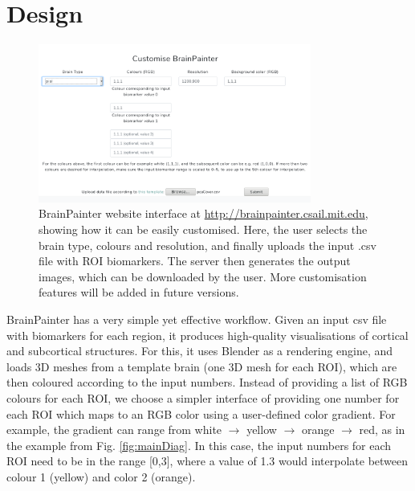 \documentclass[final,times,twocolumn,authoryear]{elsarticle}
\begin{document}
\FloatBarrier
\section{Design}
\label{design}


\begin{figure}[htp]
\centering
 \includegraphics[width=0.8\textwidth]{images/website.png}
 \caption{BrainPainter website interface at \url{http://brainpainter.csail.mit.edu}, showing how it can be easily customised. Here, the user selects the brain type, colours and resolution, and finally uploads the input .csv file with ROI biomarkers. The server then generates the output images, which can be downloaded by the user. More customisation features will be added in future versions.}
  \label{fig:website}
\end{figure}

BrainPainter has a very simple yet effective workflow. Given an input csv file with biomarkers for each region, it produces high-quality visualisations of cortical and subcortical structures. For this, it uses Blender as a rendering engine, and loads 3D meshes from a template brain (one 3D mesh for each ROI), which are then coloured according to the input numbers. Instead of providing a list of RGB colours for each ROI, we choose a simpler interface of providing one number for each ROI which maps to an RGB color using a user-defined color gradient. For example, the gradient can range from white $\rightarrow$ yellow $\rightarrow$ orange $\rightarrow$ red, as in the example from Fig. \ref{fig:mainDiag}. In this case, the input numbers for each ROI need to be in the range [0,3], where a value of 1.3 would interpolate between colour 1 (yellow) and color 2 (orange).
\end{document}

